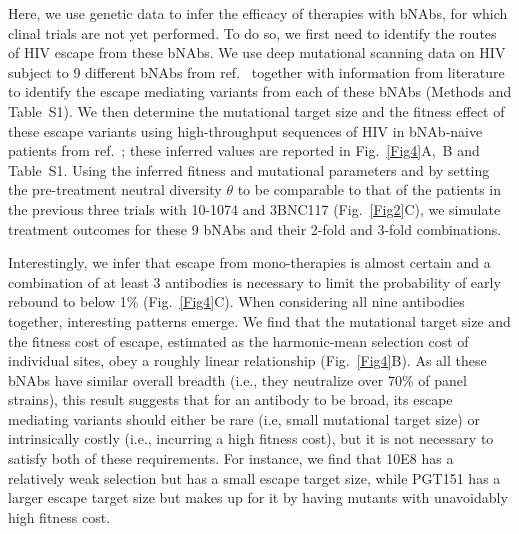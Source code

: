 \documentclass[aps,prx,noshowpacs,twocolumn,nofootinbib]{revtex4-2}
\begin{document}
	Here, we use genetic data to infer the efficacy of therapies with bNAbs, for which clinal trials  are not yet performed. To do so, we first need to identify the routes of HIV escape from these  bNAbs. We  use deep mutational scanning data on HIV subject to 9 different bNAbs from ref.~\cite{Dingens:2019fd} together with information from literature  to identify the escape mediating variants from each of these bNAbs (Methods and Table~S1). We then determine the mutational target size and the fitness effect of these escape variants using high-throughput sequences of HIV in bNAb-naive patients from ref.~\cite{Zanini:2015gg}; these inferred values are reported in Fig.~\ref{Fig4}A,~B and Table~S1. Using the inferred fitness and mutational parameters and by setting the pre-treatment neutral diversity $\theta$ to  be comparable to that of the patients in the previous three trials with 10-1074 and 3BNC117 (Fig.~\ref{Fig2}C), we simulate treatment outcomes for these 9 bNAbs and their 2-fold and 3-fold combinations. 
	
	Interestingly, we infer that escape from mono-therapies is almost certain and a  combination of at least 3 antibodies is necessary to limit the probability of early rebound to below 1\% (Fig.~\ref{Fig4}C).  When considering all nine antibodies together, interesting  patterns emerge. 
	We find that the mutational target size and the fitness cost of escape, estimated as the harmonic-mean selection cost of individual sites, obey a roughly linear relationship (Fig.~\ref{Fig4}B). As all these bNAbs have similar overall breadth (i.e., they neutralize over 70\% of panel strains), this result suggests that for an antibody to be broad, its escape mediating variants should either be rare  (i.e, small mutational target size) or  intrinsically costly  (i.e., incurring a high fitness cost), but it is not necessary to satisfy both of these requirements. For instance, we find that 10E8 has a relatively weak selection but has a small escape target size, while PGT151 has a larger escape target size but makes up for it by having mutants with unavoidably high fitness cost. 
	
\end{document}
